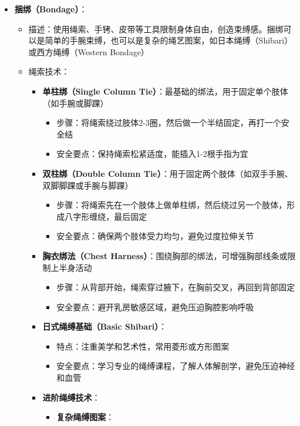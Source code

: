 \documentclass[12pt,UTF8]{ctexbook}
\begin{document}
  \begin{itemize}
  \item \textbf{捆绑（Bondage）}：
    \begin{itemize}
    \item 描述：使用绳索、手铐、皮带等工具限制身体自由，创造束缚感。捆绑可以是简单的手腕束缚，也可以是复杂的绳艺图案，如日本绳缚（Shibari）或西方绳缚（Western Bondage）
    \item 绳索技术：
      \begin{itemize}
      \item \textbf{单柱绑（Single Column Tie）}：最基础的绑法，用于固定单个肢体（如手腕或脚踝）
        \begin{itemize}
        \item 步骤：将绳索绕过肢体2-3圈，然后做一个半结固定，再打一个安全结
        \item 安全要点：保持绳索松紧适度，能插入1-2根手指为宜
        \end{itemize}
      \item \textbf{双柱绑（Double Column Tie）}：用于固定两个肢体（如双手手腕、双脚脚踝或手腕与脚踝）
        \begin{itemize}
        \item 步骤：将绳索先在一个肢体上做单柱绑，然后绕过另一个肢体，形成八字形缠绕，最后固定
        \item 安全要点：确保两个肢体受力均匀，避免过度拉伸关节
        \end{itemize}
      \item \textbf{胸衣绑法（Chest Harness）}：围绕胸部的绑法，可增强胸部线条或限制上半身活动
        \begin{itemize}
        \item 步骤：从背部开始，绳索穿过腋下，在胸前交叉，再回到背部固定
        \item 安全要点：避开乳房敏感区域，避免压迫胸腔影响呼吸
        \end{itemize}
      \item \textbf{日式绳缚基础（Basic Shibari）}：
        \begin{itemize}
        \item 特点：注重美学和艺术性，常用菱形或方形图案
        \item 安全要点：学习专业的绳缚课程，了解人体解剖学，避免压迫神经和血管
        \end{itemize}
      \item \textbf{进阶绳缚技术}：
        \begin{itemize}
        \item \textbf{复杂绳缚图案}：

\end{itemize}
\end{itemize}
\end{itemize}
\end{itemize}
\end{document}
